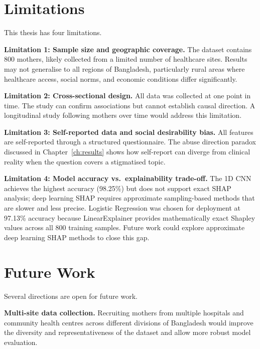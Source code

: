 \section{Limitations}
\label{ch5-sec-limitations}

This thesis has four limitations.

\textbf{Limitation 1: Sample size and geographic coverage.}
The dataset contains 800 mothers, likely collected from a limited number of healthcare sites.
Results may not generalise to all regions of Bangladesh, particularly rural areas where healthcare access, social norms, and economic conditions differ significantly.

\textbf{Limitation 2: Cross-sectional design.}
All data was collected at one point in time.
The study can confirm associations but cannot establish causal direction.
A longitudinal study following mothers over time would address this limitation.

\textbf{Limitation 3: Self-reported data and social desirability bias.}
All features are self-reported through a structured questionnaire.
The abuse direction paradox discussed in Chapter~\ref{ch:results} shows how self-report can diverge from clinical reality when the question covers a stigmatised topic.

\textbf{Limitation 4: Model accuracy vs.\ explainability trade-off.}
The 1D CNN achieves the highest accuracy (98.25\%) but does not support exact SHAP analysis; deep learning SHAP requires approximate sampling-based methods that are slower and less precise.
Logistic Regression was chosen for deployment at 97.13\% accuracy because LinearExplainer provides mathematically exact Shapley values across all 800 training samples.
Future work could explore approximate deep learning SHAP methods to close this gap.

\section{Future Work}
\label{ch5-sec-future}

Several directions are open for future work.

\textbf{Multi-site data collection.}
Recruiting mothers from multiple hospitals and community health centres across different divisions of Bangladesh would improve the diversity and representativeness of the dataset and allow more robust model evaluation.

